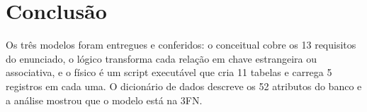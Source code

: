 \documentclass[12pt,a4paper]{article}
\begin{document}
\section{Conclusão}

Os três modelos foram entregues e conferidos: o conceitual cobre os 13
requisitos do enunciado, o lógico transforma cada relação em chave
estrangeira ou associativa, e o físico é um script executável que cria
11 tabelas e carrega 5 registros em cada uma. O dicionário de dados
descreve os 52 atributos do banco e a análise mostrou que o modelo está
na 3FN.
\end{document}
